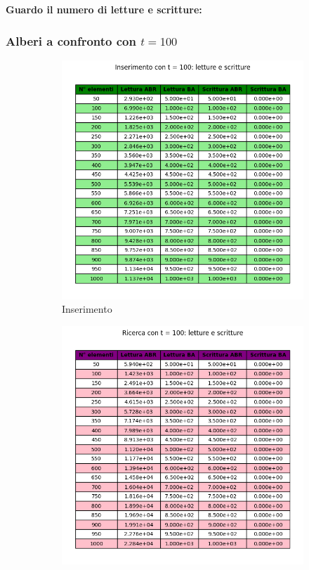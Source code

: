 \newpage
\textbf{Guardo il numero di letture e scritture:}

\subsubsection{Alberi a confronto con $t = 100$}

\begin{figure}[H]
    \centering
    \begin{subfigure}[b]{0.49\textwidth}
        \centering
        \includegraphics[width=\textwidth]{tables/insert-wr-t100.png}
        \caption{Inserimento}
        \label{fig:tableinserttimet100}
    \end{subfigure}
    \hfill
    \begin{subfigure}[b]{0.49\textwidth}
        \centering
        \includegraphics[width=\textwidth]{tables/search-wr-t100.png}

\end{subfigure}
\end{figure}
